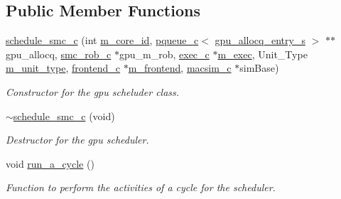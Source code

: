 \subsection*{Public Member Functions}
\begin{DoxyCompactItemize}
\item 
\hyperlink{classschedule__smc__c_ac95fdbfe0f924722b86e10deb736d7d9}{schedule\_\-smc\_\-c} (int \hyperlink{classschedule__c_a6c4f8484b3f2dae8255c0ce064f9d46e}{m\_\-core\_\-id}, \hyperlink{classpqueue__c}{pqueue\_\-c}$<$ \hyperlink{structgpu__allocq__entry__s}{gpu\_\-allocq\_\-entry\_\-s} $>$ $\ast$$\ast$gpu\_\-allocq, \hyperlink{classsmc__rob__c}{smc\_\-rob\_\-c} $\ast$gpu\_\-m\_\-rob, \hyperlink{classexec__c}{exec\_\-c} $\ast$\hyperlink{classschedule__c_a75e32c0fe0d1ad336ada30787fceafd8}{m\_\-exec}, Unit\_\-Type \hyperlink{classschedule__c_a5fd7913b69e838b56da18de2802d8a71}{m\_\-unit\_\-type}, \hyperlink{classfrontend__c}{frontend\_\-c} $\ast$\hyperlink{classschedule__c_a88ee09e9569c248374f0c943a4b73987}{m\_\-frontend}, \hyperlink{classmacsim__c}{macsim\_\-c} $\ast$simBase)
\begin{DoxyCompactList}\small\item\em Constructor for the gpu scheluder class. \item\end{DoxyCompactList}\item 
\hyperlink{classschedule__smc__c_aea8405348022655c30f22dfbe9447eda}{$\sim$schedule\_\-smc\_\-c} (void)
\begin{DoxyCompactList}\small\item\em Destructor for the gpu scheduler. \item\end{DoxyCompactList}\item 
void \hyperlink{classschedule__smc__c_aeb80c4988ef300b7dbd8f54fadc1a2ae}{run\_\-a\_\-cycle} ()
\begin{DoxyCompactList}\small\item\em Function to perform the activities of a cycle for the scheduler. \item\end{DoxyCompactList}\end{DoxyCompactItemize}
